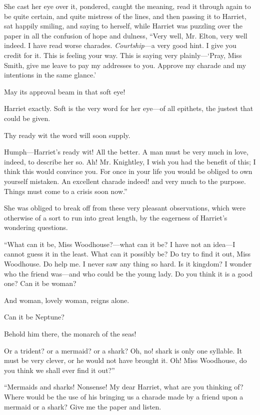 She cast her eye over it, pondered, caught the meaning, read it through again to be quite certain, and quite mistress of the lines, and then passing it to Harriet, sat happily smiling, and saying to herself, while Harriet was puzzling over the paper in all the confusion of hope and dulness, “Very well, Mr. Elton, very well indeed. I have read worse charades. {\em Courtship}---a very good hint. I give you credit for it. This is feeling your way. This is saying very plainly---‘Pray, Miss Smith, give me leave to pay my addresses to you. Approve my charade and my intentions in the same glance.'

May its approval beam in that soft eye!

Harriet exactly. Soft is the very word for her eye---of all epithets, the justest that could be given.

Thy ready wit the word will soon supply.

Humph---Harriet's ready wit! All the better. A man must be very much in love, indeed, to describe her so. Ah! Mr. Knightley, I wish you had the benefit of this; I think this would convince you. For once in your life you would be obliged to own yourself mistaken. An excellent charade indeed! and very much to the purpose. Things must come to a crisis soon now.”

She was obliged to break off from these very pleasant observations, which were otherwise of a sort to run into great length, by the eagerness of Harriet's wondering questions.

“What can it be, Miss Woodhouse?---what can it be? I have not an idea---I cannot guess it in the least. What can it possibly be? Do try to find it out, Miss Woodhouse. Do help me. I never saw any thing so hard. Is it kingdom? I wonder who the friend was---and who could be the young lady. Do you think it is a good one? Can it be woman?

And woman, lovely woman, reigns alone.

Can it be Neptune?

Behold him there, the monarch of the seas!

Or a trident? or a mermaid? or a shark? Oh, no! shark is only one syllable. It must be very clever, or he would not have brought it. Oh! Miss Woodhouse, do you think we shall ever find it out?”

“Mermaids and sharks! Nonsense! My dear Harriet, what are you thinking of? Where would be the use of his bringing us a charade made by a friend upon a mermaid or a shark? Give me the paper and listen.


